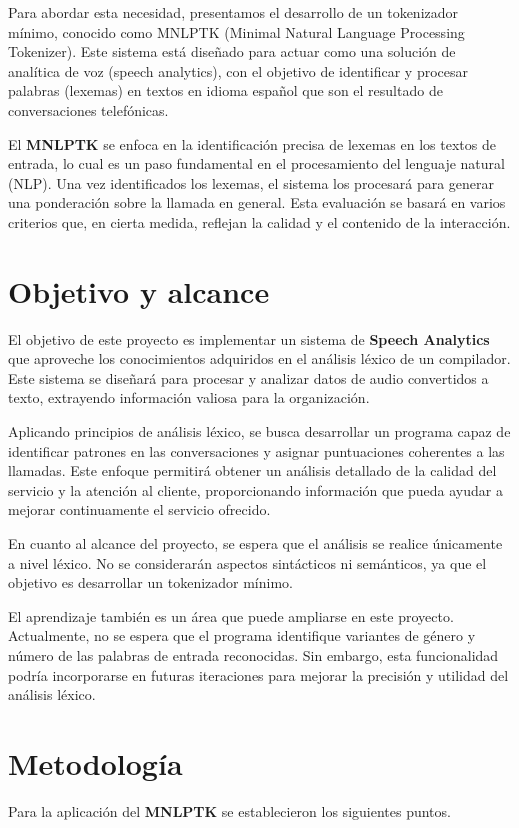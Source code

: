 \documentclass[10pt,times,twocolumn]{article}
\begin{document}
Para abordar esta necesidad, presentamos el desarrollo de un tokenizador mínimo, conocido como MNLPTK (Minimal Natural Language Processing Tokenizer). Este sistema está diseñado para actuar como una solución de analítica de voz (speech analytics), con el objetivo de identificar y procesar palabras (lexemas) en textos en idioma español que son el resultado de conversaciones telefónicas.

El \textbf{MNLPTK} se enfoca en la identificación precisa de lexemas en los textos de entrada, lo cual es un paso fundamental en el procesamiento del lenguaje natural (NLP). Una vez identificados los lexemas, el sistema los procesará para generar una ponderación sobre la llamada en general. 
Esta evaluación se basará en varios criterios que, en cierta medida, reflejan la calidad y el contenido de la interacción.

\section{Objetivo y alcance}


El objetivo de este proyecto es implementar un sistema de \textbf{Speech Analytics} que aproveche los conocimientos adquiridos en el análisis léxico de un compilador. Este sistema se diseñará para procesar y analizar datos de audio convertidos a texto, extrayendo información valiosa para la organización.

Aplicando principios de análisis léxico, se busca desarrollar un programa capaz de identificar patrones en las conversaciones y asignar puntuaciones coherentes a las llamadas. Este enfoque permitirá obtener un análisis detallado de la calidad del servicio y la atención al cliente, proporcionando información que pueda ayudar a mejorar continuamente el servicio ofrecido.

En cuanto al alcance del proyecto, se espera que el análisis se realice únicamente a nivel léxico. No se considerarán aspectos sintácticos ni semánticos, ya que el objetivo es desarrollar un tokenizador mínimo.

El aprendizaje también es un área que puede ampliarse en este proyecto. Actualmente, no se espera que el programa identifique variantes de género y número de las palabras de entrada reconocidas. Sin embargo, esta funcionalidad podría incorporarse en futuras iteraciones para mejorar la precisión y utilidad del análisis léxico.

\section{Metodología}
Para la aplicación del \textbf{MNLPTK} se establecieron los siguientes puntos.
\end{document}
